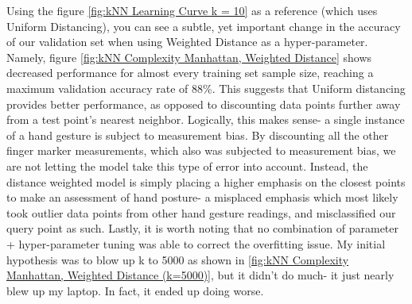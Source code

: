 \documentclass[letterpaper,12pt]{article}
\begin{document}
Using the figure \ref{fig:kNN Learning Curve k = 10} as a reference (which uses Uniform Distancing), you can see a subtle, yet important change in the accuracy of our validation set when using Weighted Distance as a hyper-parameter.  Namely, figure \ref{fig:kNN Complexity Manhattan, Weighted Distance} shows decreased performance for almost every training set sample size, reaching a maximum validation accuracy rate of 88\%.  This suggests that Uniform distancing provides better performance, as opposed to discounting data points further away from a test point's nearest neighbor.  Logically, this makes sense- a single instance of a hand gesture is subject to measurement bias.  By discounting all the other finger marker measurements, which also was subjected to measurement bias, we are not letting the model take this type of error into account.  Instead, the distance weighted model is simply placing a higher emphasis on the closest points to make an assessment of hand posture- a misplaced emphasis which most likely took outlier data points from other hand gesture readings, and misclassified our query point as such.  Lastly, it is worth noting that no combination of parameter + hyper-parameter tuning was able to correct the overfitting issue.  My initial hypothesis was to blow up k to 5000 as shown in \ref{fig:kNN Complexity Manhattan, Weighted Distance (k=5000)}, but it didn't do much- it just nearly blew up my laptop.  In fact, it ended up doing worse.
\end{document}
